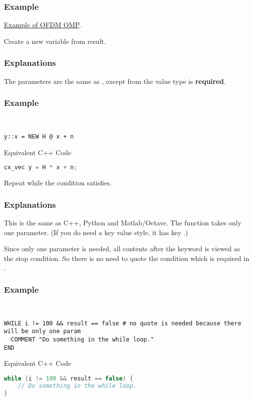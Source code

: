 \subsubsection*{Example}
\href{https://github.com/mmcesim/examples/blob/6500ae3021e06b583897f9554e694e86584064f0/MIMO_OFDM_OMP/MIMO_wideband.sim#L111}{Example of OFDM OMP}.

Create a new variable from  result.
\subsubsection*{Explanations}
The parameters are the same as ,
except from the value type is \textbf{required}.
\subsubsection*{Example}
\begin{example}~
  \begin{lstlisting}[language=mmcesim-sim]
y::v = NEW H @ x + n
  \end{lstlisting}
  Equivalent C++ Code
  \begin{lstlisting}[language=c++]
cx_vec y = H * x + n;
  \end{lstlisting}
\end{example}

Repeat while the condition satisfies.
\subsubsection*{Explanations}
This is the same as C++, Python and Matlab/Octave.
The function takes only one parameter.
(If you do need a key value style, it has key .)
\begin{tip}
  Since only one parameter is needed,
  all contents after the  keyword is viewed as the stop condition.
  So there is no need to quote the condition which is required in .
\end{tip}
\subsubsection*{Example}
\begin{example}~
  \begin{lstlisting}[language=mmcesim-sim]
WHILE i != 100 && result == false # no quote is needed because there will be only one param
  COMMENT "Do something in the while loop."
END
  \end{lstlisting}
  Equivalent C++ Code
  \begin{lstlisting}[language=c++]
while (i != 100 && result == false) {
    // Do something in the while loop.
}
  \end{lstlisting}
\end{example}

